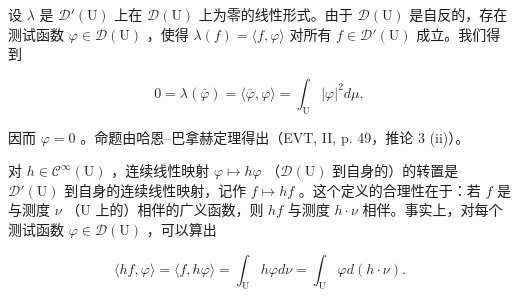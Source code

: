 设 \(\lambda\) 是 \(\mathcal{D}'(\mathrm{U})\) 上在 \(\mathcal{D}(\mathrm{U})\) 上为零的线性形式。由于 \(\mathcal{D}(\mathrm{U})\) 是自反的，存在测试函数 \(\varphi \in \mathcal{D}(\mathrm{U})\) ，使得 \(\lambda(f) = \langle f, \varphi \rangle\) 对所有 \(f \in \mathcal{D}'(\mathrm{U})\) 成立。我们得到

\[
0 = \lambda (\overline {{\varphi}}) = \langle \overline {{\varphi}}, \varphi \rangle = \int_ {\mathrm{U}} | \varphi | ^ {2} d \mu ,
\]

因而 \(\varphi = 0\) 。命题由哈恩--巴拿赫定理得出（EVT, II, p. 49，推论 3 (ii)）。

对 \(h \in \mathcal{C}^{\infty}(\mathrm{U})\) ，连续线性映射 \(\varphi \mapsto h\varphi\) （\(\mathcal{D}(\mathrm{U})\) 到自身的）的转置是 \(\mathcal{D}'(\mathrm{U})\) 到自身的连续线性映射，记作 \(f \mapsto hf\) 。这个定义的合理性在于：若 \(f\) 是与测度 \(\nu\) （\(\mathrm{U}\) 上的）相伴的广义函数，则 \(hf\) 与测度 \(h \cdot \nu\) 相伴。事实上，对每个测试函数 \(\varphi \in \mathcal{D}(\mathrm{U})\) ，可以算出

\[
\langle h f, \varphi \rangle = \langle f, h \varphi \rangle = \int_ {\mathrm{U}} h \varphi d \nu = \int_ {\mathrm{U}} \varphi d (h \cdot \nu).
\]

